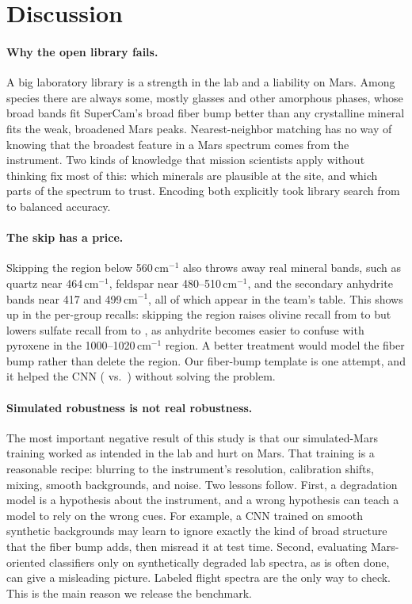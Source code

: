 \section{Discussion}
\label{sec:discussion}

\paragraph{Why the open library fails.} A big laboratory library is a strength in the lab and a liability on Mars. Among \nSpecies{} species there are always some, mostly glasses and other amorphous phases, whose broad bands fit SuperCam's broad fiber bump better than any crystalline mineral fits the weak, broadened Mars peaks. Nearest-neighbor matching has no way of knowing that the broadest feature in a Mars spectrum comes from the instrument. Two kinds of knowledge that mission scientists apply without thinking fix most of this: which minerals are plausible at the site, and which parts of the spectrum to trust. Encoding both explicitly took library search from \balCosineOpen{} to \balCosineWindowMars{} balanced accuracy.

\paragraph{The skip has a price.} Skipping the region below 560\,cm$^{-1}$ also throws away real mineral bands, such as quartz near 464\,cm$^{-1}$, feldspar near 480--510\,cm$^{-1}$, and the secondary anhydrite bands near 417 and 499\,cm$^{-1}$, all of which appear in the team's table. This shows up in the per-group recalls: skipping the region raises olivine recall from \recOlivineCosineMars{} to \recOlivineCosineWindowMars{} but lowers sulfate recall from \recSulfateCosineMars{} to \recSulfateCosineWindowMars{}, as anhydrite becomes easier to confuse with pyroxene in the 1000--1020\,cm$^{-1}$ region. A better treatment would model the fiber bump rather than delete the region. Our fiber-bump template is one attempt, and it helped the CNN (\balCnnMarsifiedArtifactMars{} vs.\ \balCnnMarsifiedMars{}) without solving the problem.

\paragraph{Simulated robustness is not real robustness.} The most important negative result of this study is that our simulated-Mars training worked as intended in the lab and hurt on Mars. That training is a reasonable recipe: blurring to the instrument's resolution, calibration shifts, mixing, smooth backgrounds, and noise. Two lessons follow. First, a degradation model is a hypothesis about the instrument, and a wrong hypothesis can teach a model to rely on the wrong cues. For example, a CNN trained on smooth synthetic backgrounds may learn to ignore exactly the kind of broad structure that the fiber bump adds, then misread it at test time. Second, evaluating Mars-oriented classifiers only on synthetically degraded lab spectra, as is often done, can give a misleading picture. Labeled flight spectra are the only way to check. This is the main reason we release the benchmark.

